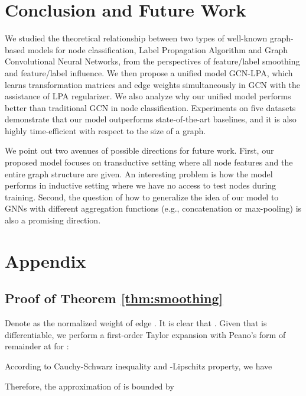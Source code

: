 \documentclass{article}
\newenvironment{proof}{{\noindent\it Proof.}\quad}{\hfill \par}
\begin{document}
\section{Conclusion and Future Work}
	We studied the theoretical relationship between two types of well-known graph-based models for node classification, Label Propagation Algorithm and Graph Convolutional Neural Networks, from the perspectives of feature/label smoothing and feature/label influence.
	We then propose a unified model GCN-LPA, which learns transformation matrices and edge weights simultaneously in GCN with the assistance of LPA regularizer.
	We also analyze why our unified model performs better than traditional GCN in node classification.
	Experiments on five datasets demonstrate that our model outperforms state-of-the-art baselines, and it is also highly time-efficient with respect to the size of a graph.
	
	We point out two avenues of possible directions for future work.
	First, our proposed model focuses on transductive setting where all node features and the entire graph structure are given.
	An interesting problem is how the model performs in inductive setting where we have no access to test nodes during training.
Second, the question of how to generalize the idea of our model to GNNs with different aggregation functions (e.g., concatenation or max-pooling) is also a promising direction.






\clearpage
\renewcommand\thesubsection{\Alph{subsection}}
\onecolumn

\section*{Appendix}
	\subsection{Proof of Theorem \ref{thm:smoothing}}
	\label{app:a}
		\begin{proof}
			Denote  as the normalized weight of edge .
			It is clear that .
			Given that  is differentiable, we perform a first-order Taylor expansion with Peano's form of remainder at  for :
			
			According to Cauchy-Schwarz inequality and -Lipschitz property, we have
			
			Therefore, the approximation of  is bounded by
			
		\end{proof}
		
\end{document}
